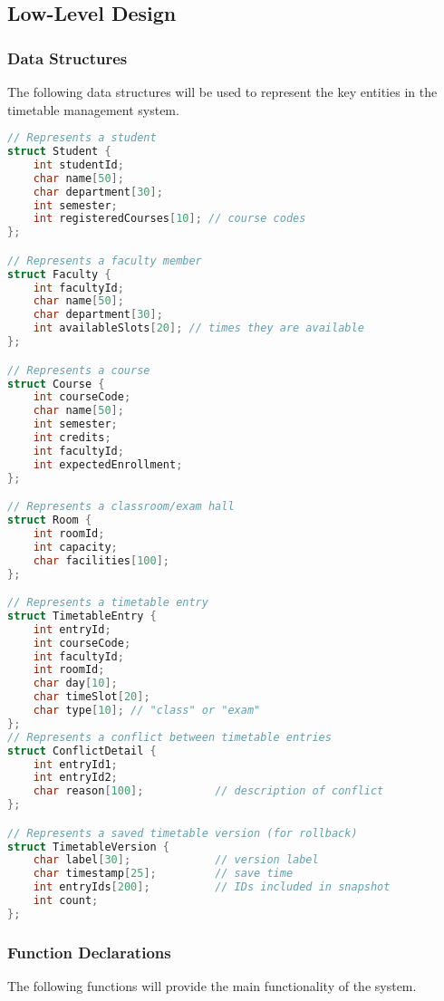 \documentclass[a4paper,12pt]{article}
\begin{document}
\subsection{Low-Level Design}
\subsubsection{Data Structures}

The following data structures will be used to represent the key entities in the timetable management system.

\begin{lstlisting}[language=C, caption={Data Structures for the Timetable System}]
// Represents a student
struct Student {
    int studentId;
    char name[50];
    char department[30];
    int semester;
    int registeredCourses[10]; // course codes
};

// Represents a faculty member
struct Faculty {
    int facultyId;
    char name[50];
    char department[30];
    int availableSlots[20]; // times they are available
};

// Represents a course
struct Course {
    int courseCode;
    char name[50];
    int semester;
    int credits;
    int facultyId;
    int expectedEnrollment;
};

// Represents a classroom/exam hall
struct Room {
    int roomId;
    int capacity;
    char facilities[100];
};

// Represents a timetable entry
struct TimetableEntry {
    int entryId;
    int courseCode;
    int facultyId;
    int roomId;
    char day[10];
    char timeSlot[20];
    char type[10]; // "class" or "exam"
};
// Represents a conflict between timetable entries
struct ConflictDetail {
    int entryId1;
    int entryId2;
    char reason[100];           // description of conflict
};

// Represents a saved timetable version (for rollback)
struct TimetableVersion {
    char label[30];             // version label
    char timestamp[25];         // save time
    int entryIds[200];          // IDs included in snapshot
    int count;
};
\end{lstlisting}
\newpage
\subsubsection{Function Declarations}

The following functions will provide the main functionality of the system.
\end{document}
